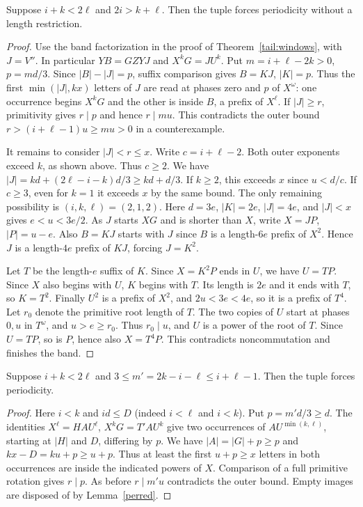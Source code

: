 \begin{theorem}\label{tail:band}
Suppose $i+k<2\ell$ and $2i>k+\ell$. Then the tuple forces
periodicity without a length restriction.
\end{theorem}
\begin{proof}
Use the band factorization in the proof of Theorem~\ref{tail:windows},
with $J=V''$. In particular $YB=GZYJ$ and $X^kG=JU^k$.
Put $m=i+\ell-2k>0$, $p=md/3$.
Since $|B|-|J|=p$, suffix comparison gives $B=KJ$, $|K|=p$.
Thus the first $\min(|J|,kx)$ letters of $J$ are read at phases
zero and $p$ of $X^\omega$: one occurrence begins $X^kG$ and
the other is inside $B$, a prefix of $X^\ell$. If $|J|\ge r$,
primitivity gives $r\mid p$ and hence $r\mid mu$. This contradicts
the outer bound $r>(i+\ell-1)u\ge mu>0$ in a counterexample.

It remains to consider $|J|<r\le x$. Write $c=i+\ell-2$.
Both outer exponents exceed $k$, as shown above. Thus $c\ge2$.
We have $|J|=kd+(2\ell-i-k)d/3\ge kd+d/3$.
If $k\ge2$, this exceeds $x$ since $u<d/c$. If $c\ge3$,
even for $k=1$ it exceeds $x$ by the same bound.
The only remaining possibility is $(i,k,\ell)=(2,1,2)$.
Here $d=3e$, $|K|=2e$, $|J|=4e$, and $|J|<x$ gives
$e<u<3e/2$. As $J$ starts $XG$ and is shorter than $X$, write
$X=JP$, $|P|=u-e$. Also $B=KJ$ starts with $J$ since $B$
is a length-$6e$ prefix of $X^2$. Hence $J$ is a length-$4e$
prefix of $KJ$, forcing $J=K^2$.

Let $T$ be the length-$e$ suffix of $K$. Since $X=K^2P$
ends in $U$, we have $U=TP$. Since $X$ also begins with $U$,
$K$ begins with $T$. Its length is $2e$ and it ends with $T$,
so $K=T^2$. Finally $U^2$ is a prefix of $X^2$,
and $2u<3e<4e$, so it is a prefix of $T^4$.
Let $r_0$ denote the primitive root length of $T$. The two copies
of $U$ start at phases $0,u$ in $T^\omega$, and $u>e\ge r_0$.
Thus $r_0\mid u$, and $U$ is a power of the root of $T$.
Since $U=TP$, so is $P$, hence also $X=T^4P$.
This contradicts noncommutation and finishes the band.
\end{proof}

\begin{corollary}\label{tail:seam}
Suppose $i+k<2\ell$ and $3\le m'=2k-i-\ell\le i+\ell-1$.
Then the tuple forces periodicity.
\end{corollary}
\begin{proof}
Here $i<k$ and $id\le D$ (indeed $i<\ell$ and $i<k$).
Put $p=m'd/3\ge d$. The identities
$X^\ell=HAU^\ell$, $X^kG=T'AU^k$ give two occurrences
of $A U^{\min(k,\ell)}$, starting at $|H|$ and $D$, differing
by $p$. We have $|A|=|G|+p\ge p$ and $kx-D=ku+p\ge u+p$.
Thus at least the first $u+p\ge x$ letters in both occurrences
are inside the indicated powers of $X$. Comparison of a full primitive
rotation gives $r\mid p$. As before $r\mid m'u$ contradicts the
outer bound. Empty images are disposed of by Lemma~\ref{perred}.
\end{proof}

